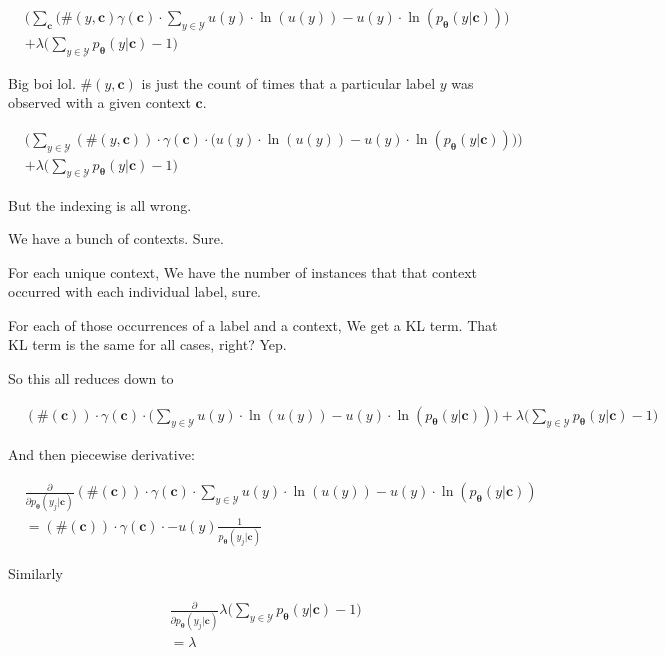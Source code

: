 \documentclass{article}
\newcommand{\vtheta}{\boldsymbol{\theta}}
\newcommand{\model}{p_{\vtheta}}
\newcommand{\context}{\boldsymbol{c}}
\begin{document}
			\begin{align}
				&\bigg(\sum_{\context} (\#(y, \context)\gamma(\context)\cdot\sum_{y\in\mathcal{Y}} u(y)\cdot\ln(u(y)) - u(y)\cdot\ln(\model(y|\context))\bigg) \\
			&+ \lambda\bigg(\sum_{y\in\mathcal{Y}} \model(y|\context) -1 \bigg)
			\end{align}
			
			Big boi lol. $\#(y, \context)$ is just the count of times that a particular label $y$ was observed with a given context $\context$.
			
			\begin{align}
				&\bigg(\sum_{y\in\mathcal{Y}} (\#(y, \context))\cdot \gamma(\context)\cdot \big( u(y)\cdot\ln(u(y)) - u(y)\cdot\ln(\model(y|\context))\big)\bigg) \\
			&+ \lambda\bigg(\sum_{y\in\mathcal{Y}} \model(y|\context) -1 \bigg)
			\end{align}
			
			But the indexing is all wrong.
			
			We have a bunch of contexts. Sure.
			
			For each unique context, We have the number of instances that that context occurred with each individual label, sure.
			
			For each of those occurrences of a label and a context, We get a KL term. That KL term is the same for all cases, right? Yep.
			
			So this all reduces down to
			
			\begin{align}
				&(\#(\context))\cdot \gamma(\context)\cdot \bigg( \sum_{y\in\mathcal{Y}} u(y)\cdot\ln(u(y)) - u(y)\cdot\ln(\model(y|\context))\bigg) + \lambda\bigg(\sum_{y\in\mathcal{Y}} \model(y|\context) -1 \bigg)
			\end{align}
			
			And then piecewise derivative:
			
			\begin{align}
				& \frac{\partial}{\partial \model(y_j|\context)} (\#(\context))\cdot \gamma(\context)\cdot  \sum_{y\in\mathcal{Y}} u(y)\cdot\ln(u(y)) - u(y)\cdot\ln(\model(y|\context))\\
				&=  (\#(\context))\cdot \gamma(\context)\cdot    - u(y)\frac{1}{\model(y_j|\context)}
			\end{align}
			
			Similarly
			
			\begin{align}
				&\frac{\partial}{\partial \model(y_j|\context)} \lambda\bigg(\sum_{y\in\mathcal{Y}} \model(y|\context) -1 \bigg)\\
				&=\lambda
			\end{align}
			
\end{document}
